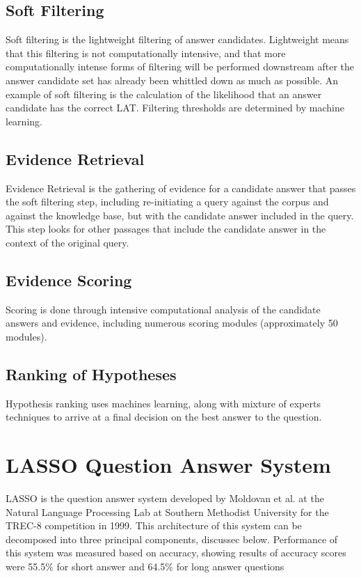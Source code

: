 \subsection{Soft Filtering}

Soft filtering is the lightweight filtering of answer candidates.  Lightweight means that this filtering is not computationally intensive, and that more computationally intense forms of filtering will be performed downstream after the answer candidate set has already been whittled down as much as possible.  An example of soft filtering is the calculation of the likelihood that an answer candidate has the correct LAT.  Filtering thresholds are determined by machine learning.

\subsection{Evidence Retrieval}

Evidence Retrieval is the gathering of evidence for a candidate answer that passes the soft filtering step, including re-initiating a query against the corpus and against the knowledge base, but with the candidate answer included in the query.  This step looks for other passages that include the candidate answer in the context of the original query.

\subsection{Evidence Scoring}

Scoring is done through intensive computational analysis of the candidate answers and evidence, including numerous scoring modules (approximately 50 modules).

\subsection{Ranking of Hypotheses}

Hypothesis ranking uses machines learning, along with mixture of experts techniques to arrive at a final
decision on the best answer to the question.

\section{LASSO Question Answer System}

LASSO \cite{moldovan_1999} is the question answer system developed by Moldovan et al. at the Natural Language Processing Lab at Southern Methodist University for the TREC-8 competition in 1999.  This architecture of this system can be decomposed into three principal components, discussec below.  Performance of this system was measured based on accuracy, showing results of accuracy scores were 55.5\% for short answer and 64.5\% for long answer questions

